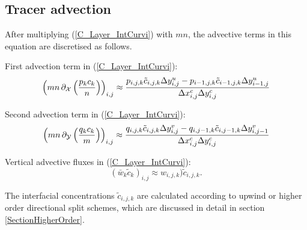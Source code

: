 \subsection{Tracer advection}

After multiplying (\ref{C_Layer_IntCurvi}) with $mn$, the advective 
terms in this equation are discretised as follows. 

First advection term in (\ref{C_Layer_IntCurvi}):
\begin{equation}
\left(mn\,\partial_{\cal X}\left(\frac{p_kc_k}{n}\right)\right)_{i,j}\approx 
\frac{
p_{i,j,k}\tilde c_{i,j,k}\Delta y^u_{i,j}-
p_{i-1,j,k}\tilde c_{i-1,j,k}\Delta y^u_{i-1,j}
}{\Delta x^c_{i,j}\Delta y^c_{i,j}}
\end{equation}

Second advection term in (\ref{C_Layer_IntCurvi}):
\begin{equation}
\left(mn\,\partial_{\cal Y}\left(\frac{q_kc_k}{m}\right)\right)_{i,j}\approx 
\frac{
q_{i,j,k}\tilde c_{i,j,k}\Delta y^v_{i,j}-
q_{i,j-1,k}\tilde c_{i,j-1,k}\Delta y^v_{i,j-1}
}{\Delta x^c_{i,j}\Delta y^c_{i,j}}
\end{equation}

Vertical advective fluxes in (\ref{C_Layer_IntCurvi}):
\begin{equation}
\left(\bar w_{k} \tilde c_{k}\right)_{i,j}\approx
w_{i,j,k})\tilde c_{i,j,k}. 
\end{equation}

The interfacial concentrations $\tilde c_{i,j,k}$ are calculated 
according to upwind or higher order directional split
schemes, which are discussed in detail in section 
\ref{SectionHigherOrder}. 

